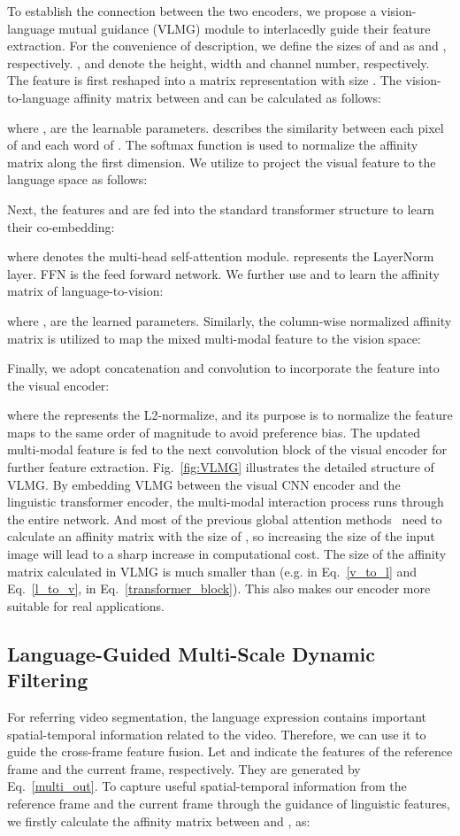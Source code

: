 \documentclass[10pt,twocolumn,letterpaper]{article}
\begin{document}
To establish the connection between the two encoders, we propose a vision-language mutual guidance (VLMG) module to interlacedly guide their feature extraction. For the convenience of description, we define the sizes of  and  as  and , respectively. ,  and  denote the height, width and channel number, respectively.
The feature  is first reshaped into a matrix representation with size . The vision-to-language affinity matrix between  and  can be calculated as follows:

where ,  are the learnable parameters.  describes the similarity between each pixel of  and each word of . The softmax function is used to normalize the affinity matrix along the first dimension. We utilize  to project the visual feature  to the language space as follows:


Next, the features  and  are fed into the standard transformer structure to learn their co-embedding:

where  denotes the multi-head self-attention module.  represents the LayerNorm layer. FFN is the feed forward network. We further use  and  to learn the affinity matrix of language-to-vision:

where ,  are the learned parameters. Similarly, the column-wise normalized affinity matrix  is utilized to map the mixed multi-modal feature  to the vision space:


Finally, we adopt concatenation  and convolution  to incorporate the feature  into the visual encoder:

where the  represents the L2-normalize, and its purpose is to normalize the feature maps to the same order of magnitude to avoid preference bias. The updated multi-modal feature  is fed to the next convolution block of the visual encoder for further feature extraction.
Fig.~\ref{fig:VLMG} illustrates the detailed structure of VLMG.
By embedding VLMG between the visual CNN encoder and the linguistic transformer encoder, the multi-modal interaction process runs through the entire network. And most of the previous global attention methods~\cite{wang2019asymmetric,hu2020bi} need to calculate an affinity matrix with the size of , so increasing the size of the input image will lead to a sharp increase in computational cost. The size of the affinity matrix calculated in VLMG is much smaller than  (e.g.  in Eq.~\ref{v_to_l} and Eq.~\ref{l_to_v},  in Eq.~\ref{transformer_block}). This also makes our encoder more suitable for real applications.
\subsection{Language-Guided Multi-Scale Dynamic Filtering}
For referring video segmentation, the language expression contains important spatial-temporal information related to the video. Therefore, we can use it to guide the cross-frame feature fusion.
Let  and  indicate the features of the reference frame and the current frame, respectively. They are generated by Eq.~\ref{multi_out}.
To capture useful spatial-temporal information from the reference frame and the current frame through the guidance of linguistic features,
we firstly calculate the affinity matrix  between  and , as:
\end{document}
